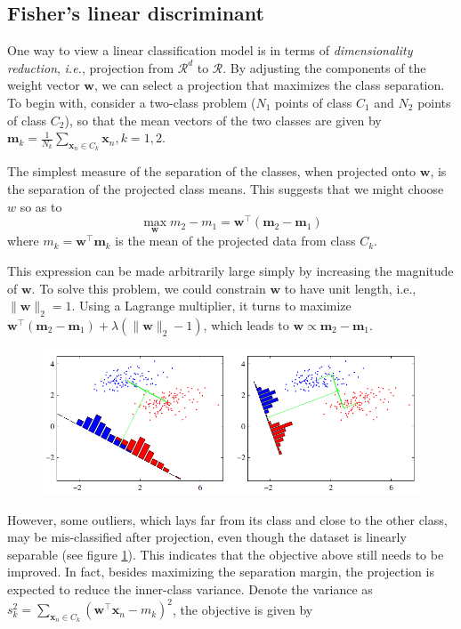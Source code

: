 \documentclass{article}
\begin{document}
	\subsection{Fisher's linear discriminant}
	
	One way to view a linear classification model is in terms of \textit{dimensionality reduction}, \textit{i.e.}, projection from $\mathcal{R}^d$ to $\mathcal{R}$. By adjusting the components of the weight vector $\mathbf{w}$, we can select a projection that maximizes the class separation. To begin with, consider a two-class problem ($N_1$ points of class $C_1$ and $N_2$ points of class $C_2$), so that the mean vectors of the two classes are given by $\mathbf{m}_k = \frac{1}{N_k} \sum_{\mathbf{x}_n \in C_k} \mathbf{x}_n, k=1,2$.

	The simplest measure of the separation of the classes, when projected onto $\mathbf{w}$, is the separation of the projected class means. This suggests that we might choose $w$ so as to
	\begin{equation*}
	\max_\mathbf{w} m_2- m_1=\mathbf{w}^\top (\mathbf{m}_2-\mathbf{m}_1)
	\end{equation*}
where $m_k=\mathbf{w}^\top \mathbf{m}_k$ is the mean of the projected data from class $C_k$. 

	This expression can be made arbitrarily large simply by increasing the magnitude of $\mathbf{w}$. To solve this problem, we could constrain $\mathbf{w}$ to have unit length, i.e., $\|\mathbf{w}\|_2=1$. Using a Lagrange multiplier, it turns to maximize $\mathbf{w}^\top (\mathbf{m}_2-\mathbf{m}_1) + \lambda (\|\mathbf{w}\|_2-1)$, which leads to $\mathbf{w}\propto \mathbf{m}_2-\mathbf{m}_1$.
	
	\begin{figure}
	\includegraphics[scale=.7]{C4 fisher.png}	
	\label{fig4.1}
	\end{figure}
However, some outliers, which lays far from its class and close to the other class, may be mis-classified after projection, even though the dataset is linearly separable (see figure \ref{fig4.1}). This indicates that the objective above still needs to be improved. In fact, besides maximizing the separation margin, the projection is expected to reduce the inner-class variance. Denote the variance as $s_k^2=\sum_{\mathbf{x}_n\in C_k} (\mathbf{w}^\top\mathbf{x}_n-m_k)^2$, the objective is given by
	
\end{document}
